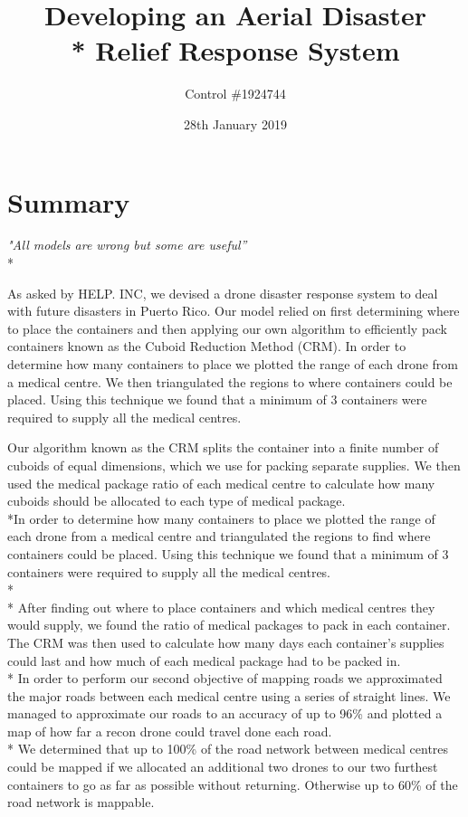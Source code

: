\documentclass[a4paper,12pt]{article}
\begin{document}
\title{Developing an Aerial Disaster \\* Relief Response System}
\author{Control \#1924744}
\date{28th January 2019}
\maketitle
\newpage


\pagestyle{style2}

\section*{\hfil Summary\hfil}
\begin{center}
\textit{"All models are wrong but some are useful''} \\*
\end{center}
As asked by HELP. INC, we devised a drone disaster response system to deal with future disasters in Puerto Rico.
Our model relied on first determining where to place the containers and then applying our own algorithm to efficiently pack containers known as the Cuboid Reduction Method (CRM).
In order to determine how many containers to place we plotted the range of each drone from a medical centre. We then triangulated the regions to where containers could be placed.
Using this technique we found that a minimum of 3 containers were required to supply all the medical centres.

Our algorithm known as the CRM splits the container into a finite number of cuboids of equal dimensions, which we use for packing separate supplies.
We then used the medical package ratio of each medical centre to calculate how many cuboids should be allocated to each type of medical package.
\\*In order to determine how many containers to place we plotted the range of each drone from a medical centre and triangulated the regions to find where containers could be placed.
Using this technique we found that a minimum of 3 containers were required to supply all the medical centres. \\*\\*
After finding out where to place containers and which medical centres they would supply, we found the ratio of medical packages to pack in each container.
The CRM was then used to calculate how many days each container's supplies could last and how much of each medical package had to be packed in.
\\*
In order to perform our second objective of mapping roads we approximated the major roads between each medical centre using a series of straight lines.
We managed to approximate our roads to an accuracy of up to 96\% and plotted a map of how far a recon drone could travel done each road.\\* We determined that up to 100\% of the road network between medical centres
could be mapped if we allocated an additional two drones to our two furthest containers to go as far as possible without returning. Otherwise up to 60\% of the road network is mappable.
\end{document}
